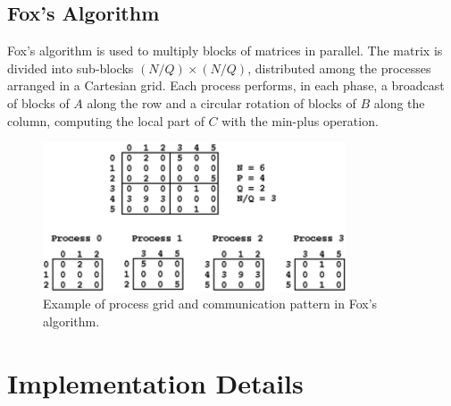 \documentclass[10pt,a4paper]{article}
\begin{document}
\subsection{Fox's Algorithm}
Fox's algorithm is used to multiply blocks of matrices in parallel. The matrix is divided into sub-blocks \((N/Q) \times (N/Q)\), distributed among the processes arranged in a Cartesian grid. Each process performs, in each phase, a broadcast of blocks of \(A\) along the row and a circular rotation of blocks of \(B\) along the column, computing the local part of \(C\) with the min-plus operation.

\begin{figure}[H]
  \centering
  \includegraphics[width=0.8\textwidth]{matrix_foxImage.png}
  \caption{Example of process grid and communication pattern in Fox's algorithm.}
  \label{fig:fox_algorithm}
\end{figure}

\section{Implementation Details}
\end{document}
